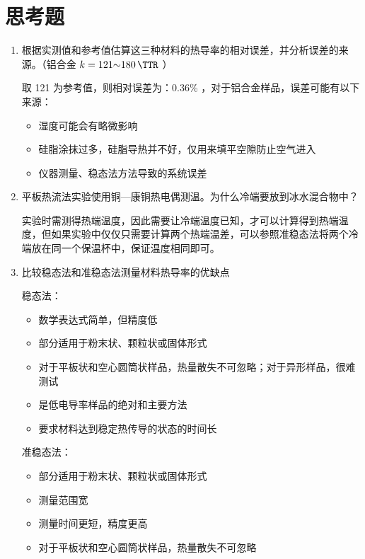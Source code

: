 \documentclass[a4paper,utf8]{article}
\begin{document}
\section{思考题}
    \begin{enumerate}
        \item 根据实测值和参考值估算这三种材料的热导率的相对误差，并分析误差的来源。（铝合金 $k=\qrange{121}{180}{\TTR}$ ）\par
        取 121 \unit{\TTR} 为参考值，则相对误差为：0.36\% ，对于铝合金样品，误差可能有以下来源：
        \begin{itemize}
            \item 湿度可能会有略微影响
            \item 硅脂涂抹过多，硅脂导热并不好，仅用来填平空隙防止空气进入
            \item 仪器测量、稳态法方法导致的系统误差
        \end{itemize}
        \item 平板热流法实验使用铜—康铜热电偶测温。为什么冷端要放到冰水混合物中？\par
        实验时需测得热端温度，因此需要让冷端温度已知，才可以计算得到热端温度，但如果实验中仅仅只需要计算两个热端温差，可以参照准稳态法将两个冷端放在同一个保温杯中，保证温度相同即可。
        \item 比较稳态法和准稳态法测量材料热导率的优缺点\par
            稳态法：
            \begin{itemize}
                \item 数学表达式简单，但精度低
                \item 部分适用于粉末状、颗粒状或固体形式
                \item 对于平板状和空心圆筒状样品，热量散失不可忽略；对于异形样品，很难测试
                \item 是低电导率样品的绝对和主要方法
                \item 要求材料达到稳定热传导的状态的时间长
            \end{itemize}\par
            准稳态法：
            \begin{itemize}
                \item 部分适用于粉末状、颗粒状或固体形式
                \item 测量范围宽
                \item 测量时间更短，精度更高
                \item 对于平板状和空心圆筒状样品，热量散失不可忽略

\end{itemize}
\end{enumerate}
\end{document}
